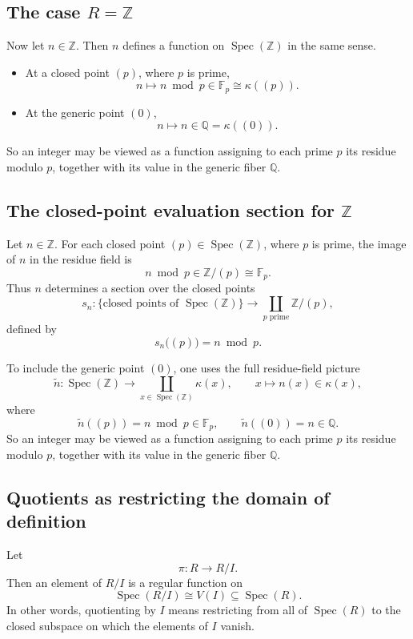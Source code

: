 \documentclass[11pt]{article}
\theoremstyle{definition}
\newcommand{\Z}{\mathbb{Z}}
\newcommand{\Q}{\mathbb{Q}}
\newcommand{\F}{\mathbb{F}}
\newcommand{\Spec}{\operatorname{Spec}}
\newcommand{\kk}[1]{\kappa\!\left(#1\right)}
\begin{document}
	\subsection{The case \texorpdfstring{$R=\Z$}{R=Z}}
	
	Now let \(n\in \Z\). Then \(n\) defines a function on \(\Spec(\Z)\) in the same sense.
	
	\begin{itemize}
		\item At a closed point \((p)\), where \(p\) is prime,
		\[
		n \longmapsto n \bmod p \in \F_p \cong \kk{(p)}.
		\]
		
		\item At the generic point \((0)\),
		\[
		n \longmapsto n\in \Q=\kk{(0)}.
		\]
	\end{itemize}
	
	So an integer may be viewed as a function assigning to each prime \(p\) its residue modulo \(p\), together with its value in the generic fiber \(\Q\).
	
	\subsection{The closed-point evaluation section for \texorpdfstring{$\Z$}{Z}}
	
	Let \(n\in \Z\). For each closed point \((p)\in \Spec(\Z)\), where \(p\) is prime, the image of \(n\) in the residue field is
	\[
	n \bmod p \in \Z/(p)\cong \F_p.
	\]
	Thus \(n\) determines a section over the closed points
	\[
	s_n:\{\text{closed points of }\Spec(\Z)\}\longrightarrow
	\coprod_{p\text{ prime}} \Z/(p),
	\]
	defined by
	\[
	s_n\bigl((p)\bigr)=n \bmod p.
	\]
	
	To include the generic point \((0)\), one uses the full residue-field picture
	\[
	\widetilde n:\Spec(\Z)\longrightarrow \coprod_{x\in \Spec(\Z)}\kk{x},
	\qquad
	x\longmapsto n(x)\in \kk{x},
	\]
	where
	\[
	\widetilde n((p))=n\bmod p\in \F_p,
	\qquad
	\widetilde n((0))=n\in \Q.
	\]
	So an integer may be viewed as a function assigning to each prime \(p\) its residue modulo \(p\), together with its value in the generic fiber \(\Q\).
	
	\subsection{Quotients as restricting the domain of definition}
	
	Let
	\[
	\pi:R\to R/I.
	\]
	Then an element of \(R/I\) is a regular function on
	\[
	\Spec(R/I)\cong V(I)\subseteq \Spec(R).
	\]
	In other words, quotienting by \(I\) means restricting from all of \(\Spec(R)\) to the closed subspace on which the elements of \(I\) vanish.
	
\end{document}
